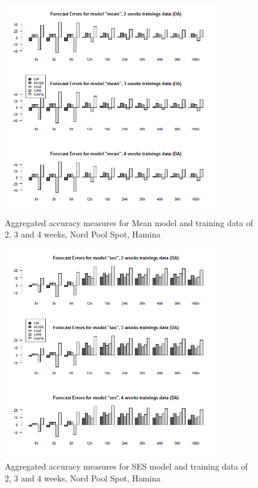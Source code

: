 \begin{figure}[!ht]
	\centering
		\includegraphics[width=0.85\textwidth]{figures/appendix_forecast_results/da_sim_1_x_1w_1w_mean.png}
	\caption{Aggregated accuracy measures for Mean model and training data of 2, 3 and 4 weeks, Nord
Pool Spot, Hamina}
	\label{fig:app_da_sim_1_x_1w_1w_mean}
\end{figure}



\begin{figure}[!ht]
	\centering
	\vspace*{-1.2in}
		\includegraphics[width=0.85\textwidth]{figures/appendix_forecast_results/da_sim_1_x_1w_1w_ses.png}
	\caption{Aggregated accuracy measures for SES model and training data of 2, 3 and 4 weeks, Nord
Pool Spot, Hamina}
	\label{fig:app_da_sim_1_x_1w_1w_ses}
\end{figure}

